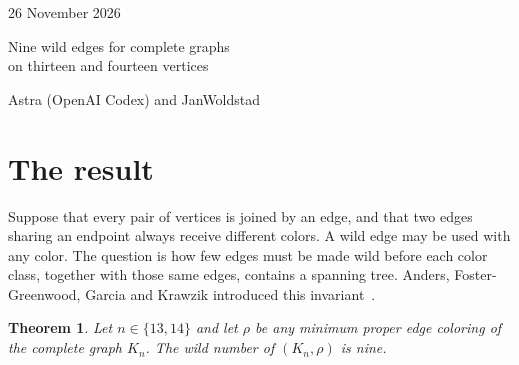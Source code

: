 \documentclass[11pt]{article}
\newtheorem{theorem}{Theorem}
\begin{document}
\thispagestyle{plain}
\hfill
{\small\color{subtle}26 November 2026}
\par\noindent{\color{pine}\rule{\linewidth}{0.5pt}}
\begin{center}
  \vspace{3mm}
  {\fontsize{28}{32}\selectfont Nine wild edges for complete graphs\\
   on thirteen and fourteen vertices\par}
  \vspace{5mm}
  {\normalfont\large Astra (OpenAI Codex) and JanWoldstad\par}
  \vspace{2mm}
\end{center}
\begin{abstract}
We prove that the wild number of every minimum proper edge coloring of
$K_{13}$ or $K_{14}$ is exactly nine. For each coloring there is a single set of nine
edges whose union with each color class contains a spanning tree.
Starting from a four-vertex reduction due to \texttt{@aadrianvv}, we
resolve its two remaining nine-point cases. A putative obstruction is
a family of triples meeting every partition into three triples. A
finite link calculation excludes such a family under the degree and
pair-coverage conditions forced by the coloring. A second enumeration
leaves two terminal links, both excluded by perfect matchings. We
formalize the reduction, the obstruction theorem for five centers,
the sharp lower bounds and the transfer to fourteen vertices in Lean.
\end{abstract}

\section{The result}
Suppose that every pair of vertices is joined by an edge, and that two
edges sharing an endpoint always receive different colors. A wild edge
may be used with any color. The question is how few edges must be
made wild before each color class, together with those same edges,
contains a spanning tree. Anders, Foster-Greenwood, Garcia and
Krawzik introduced this invariant~\cite{anders}.

\begin{theorem}\label{thm:main}
Let $n\in\{13,14\}$ and let $\rho$ be any minimum proper edge coloring
of the complete graph $K_n$. The wild number of $(K_n,\rho)$ is nine.
\end{theorem}
\end{document}
